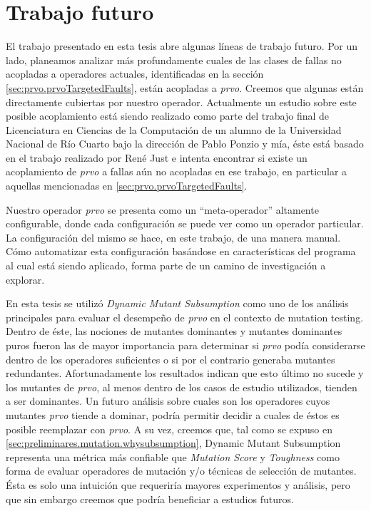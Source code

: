 \chapter[Trabajo futuro]{Trabajo futuro}
\label{cap:futurework}

El trabajo presentado en esta tesis abre algunas l\'ineas de trabajo futuro. Por un lado, planeamos analizar m\'as profundamente cuales de las clases de fallas no acopladas a operadores actuales, identificadas en la secci\'on \ref{sec:prvo.prvoTargetedFaults}, est\'an acopladas a \emph{prvo}. Creemos que algunas est\'an directamente cubiertas por nuestro operador. Actualmente un estudio sobre este posible acoplamiento est\'a siendo realizado como parte del trabajo final de Licenciatura en Ciencias de la Computaci\'on de un alumno de la Universidad Nacional de R\'io Cuarto bajo la direcci\'on de Pablo Ponzio y m\'ia, \'este est\'a basado en el trabajo realizado por Ren\'e Just \cite{bibliography.mutation.evaluation.valid-substitute} e intenta encontrar si existe un acoplamiento de \emph{prvo} a fallas a\'un no acopladas en ese trabajo, en particular a aquellas mencionadas en \ref{sec:prvo.prvoTargetedFaults}.

Nuestro operador \emph{prvo} se presenta como un ``meta-operador'' altamente configurable, donde cada configuraci\'on se puede ver como un operador particular. La configuraci\'on del mismo se hace, en este trabajo, de una manera manual. C\'omo automatizar esta configuraci\'on bas\'andose en caracter\'isticas del programa al cual est\'a siendo aplicado, forma parte de un camino de investigaci\'on a explorar.

En esta tesis se utiliz\'o \emph{Dynamic Mutant Subsumption} como uno de los an\'alisis principales para evaluar el desempe\~no de \emph{prvo} en el contexto de mutation testing. Dentro de \'este, las nociones de mutantes dominantes y mutantes dominantes puros fueron las de mayor importancia para determinar si \emph{prvo} pod\'ia considerarse dentro de los operadores suficientes o si por el contrario generaba mutantes redundantes. Afortunadamente los resultados indican que esto \'ultimo no sucede y los mutantes de \emph{prvo}, al menos dentro de los casos de estudio utilizados, tienden a ser dominantes. Un futuro an\'alisis sobre cuales son los operadores cuyos mutantes \emph{prvo} tiende a dominar, podr\'ia permitir decidir a cuales de \'estos es posible reemplazar con \emph{prvo}. A su vez, creemos que, tal como se expuso en \ref{sec:preliminares.mutation.whysubsumption}, Dynamic Mutant Subsumption representa una m\'etrica m\'as confiable que \emph{Mutation Score} y \emph{Toughness} como forma de evaluar operadores de mutaci\'on y/o t\'ecnicas de selecci\'on de mutantes. \'Esta es solo una intuici\'on que requerir\'ia mayores experimentos y an\'alisis, pero que sin embargo creemos que podr\'ia beneficiar a estudios futuros. 

